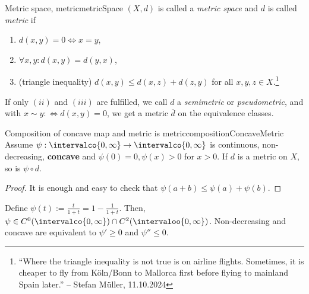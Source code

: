 \documentclass[language=english]{../../Template/TemplateLecture}
\begin{document}
\begin{defi}{Metric space, metric}{metricSpace}
    $(X,d)$ is called a \emph{metric space} and $d$ is called \emph{metric} if
    \begin{enumerate}[$(i)$]
        \item $d(x,y) = 0 \Leftrightarrow x = y$,
        \item $\forall x,y: d(x,y) = d(y,x)$,
        \item (triangle inequality) $d(x,y) \leq d(x,z) + d(z,y)$ for all $x,y,z \in X$.\footnote{\enquote{Where the triangle inequality is not true is on airline flights. Sometimes, it is cheaper to fly from Köln/Bonn to Mallorca first before flying to mainland Spain later.} -- Stefan Müller, 11.10.2024}
    \end{enumerate}
    If only $(ii)$ and $(iii)$ are fulfilled, we call $d$ a \emph{semimetric} or \emph{pseudometric}, and with $x \sim y :\Leftrightarrow d(x,y) = 0$, we get a metric $\overline{d}$ on the equivalence classes.
\end{defi}

\begin{lem}{Composition of concave map and metric is metric}{compositionConcaveMetric}
    Assume $\psi: \intervalco{0,\infty} \to \intervalco{0,\infty}$ is continuous, non-decreasing, \textbf{concave} and $\psi(0) = 0, \psi(x) > 0$ for $x > 0$. If $d$ is a metric on $X$, so is $\psi \circ d$.
\end{lem}

\begin{proof}
    It is enough and easy to check that $\psi(a+b) \leq \psi(a) + \psi(b)$. 
\end{proof}

\begin{beispiel}
    Define $\psi(t) := \frac{t}{1+t} = 1 - \frac{1}{1+t}$. Then, $\psi \in C^0(\intervalco{0,\infty}) \cap C^2(\intervaloo{0,\infty})$. Non-decreasing and concave are equivalent to $\psi' \geq 0$ and $\psi'' \leq 0$.
\end{beispiel}
\end{document}
